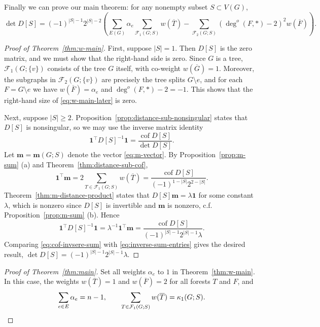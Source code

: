 \documentclass{amsart}
\theoremstyle{definition}
\newcommand{\bone}{\mathbf{1}}
\newcommand{\boldm}{\mathbf{m}}
\newcommand{\tr}{\intercal}
\DeclareMathOperator{\cof}{cof}
\newcommand{\trees}{\mathcal{F}_1}
\newcommand{\forests}{\mathcal{F}}
\newcommand{\degout}{\deg^o}
\begin{document}
Finally we can prove our main theorem: for any nonempty subset $S \subset V(G)$,
\begin{equation}
\label{eq:w-main-later}
	\det D[S] = (-1)^{|S|-1} 2^{|S|-2} \left( \sum_{E(G)}\alpha_e \sum_{\trees(G;S)} w(\overline{T}) - \sum_{\forests_2(G;S)} (\degout(F,*) - 2)^2 w(\overline{F}) \right).
\end{equation}
\begin{proof}[Proof of Theorem~\ref{thm:w-main}]
First, suppose $|S| = 1$.
Then $D[S]$ is the zero matrix, and we must show that the right-hand side is zero.
Since $G$ is a tree, $\trees(G; \{v\})$ consists of the tree $G$ itself, with co-weight $w(\overline{G}) = 1$.
Moreover, the subgraphs in $\forests_2(G; \{v\})$ are precisely the tree splits $G \setminus e$, and for each $F = G \setminus e$ we have 
$w(\overline{F}) = \alpha_e$ and
$\degout(F, *) - 2 = -1$.
This shows that the right-hand size of \eqref{eq:w-main-later} is zero.

Next, suppose $|S| \geq 2$.
Proposition~\ref{prop:distance-sub-nonsingular} states that $D[S]$ is nonsingular, so we may use the inverse matrix identity
\begin{equation}\label{eq:cof-invsere-sum}
	\bone^\tr D[S]^{-1} \bone =
	\frac{\cof D[S]}{\det D[S]}. 
\end{equation}
Let $\boldm = \boldm(G; S)$ denote the vector \eqref{eq:m-vector}.
By 
Proposition~\ref{prop:m-sum} (a) and
Theorem~\ref{thm:distance-sub-cof},
\[
	\bone^\tr \boldm 
	= 2 \sum_{T \in \trees(G;S)} w(\overline{T})
	= \frac{\cof D[S]}{(-1)^{1 - |S|} 2^{2 - |S|} }.
\]
Theorem~\ref{thm:m-distance-product} states that $D[S] \boldm = \lambda \bone$
for some constant $\lambda$,
which is nonzero since $D[S]$ is invertible and $\boldm$ is nonzero, c.f. Proposition~\ref{prop:m-sum} (b).
Hence
\begin{equation}\label{eq:inverse-sum-entries}
	\bone^\tr D[S]^{-1} \bone
	= \lambda^{-1} \bone^\tr \boldm
	= \frac{\cof D[S]}{(-1)^{|S| - 1} 2^{|S| - 1} \lambda} .
\end{equation}
Comparing \eqref{eq:cof-invsere-sum} with \eqref{eq:inverse-sum-entries} gives the desired result,
$\det D[S] = (-1)^{|S| - 1} 2^{|S| - 1} \lambda$.
\end{proof}

\begin{proof}[Proof of Theorem~\ref{thm:main}]
Set all weights $\alpha_e$ to $1$ in Theorem~\ref{thm:w-main}.
In this case, the weights $w(\overline{T}) = 1$ and $w(\overline{F}) = 2$ for all forests $T$ and $F$,
and 
\[
	\sum_{e \in E} \alpha_e = n - 1, 
	\qquad \sum_{T \in \trees(G;S)} w(\overline{T}) = \kappa_1(G; S).
	\qedhere
\]
\end{proof}
\end{document}
